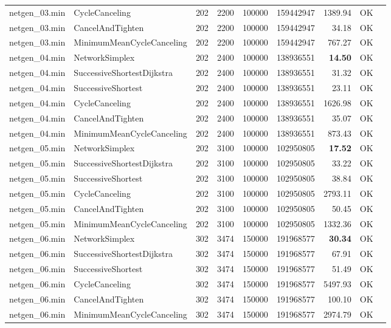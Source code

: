 \begin{longtable}{llrrrrrrl}
netgen\_03.min & CycleCanceling & 202 & 2200 & 100000 & 159442947 & 1389.94 & OK \\
netgen\_03.min & CancelAndTighten & 202 & 2200 & 100000 & 159442947 & 34.18 & OK \\
netgen\_03.min & MinimumMeanCycleCanceling & 202 & 2200 & 100000 & 159442947 & 767.27 & OK \\
\midrule
netgen\_04.min & NetworkSimplex & 202 & 2400 & 100000 & 138936551 & \textbf{14.50} & OK \\
netgen\_04.min & SuccessiveShortestDijkstra & 202 & 2400 & 100000 & 138936551 & 31.32 & OK \\
netgen\_04.min & SuccessiveShortest & 202 & 2400 & 100000 & 138936551 & 23.11 & OK \\
netgen\_04.min & CycleCanceling & 202 & 2400 & 100000 & 138936551 & 1626.98 & OK \\
netgen\_04.min & CancelAndTighten & 202 & 2400 & 100000 & 138936551 & 35.07 & OK \\
netgen\_04.min & MinimumMeanCycleCanceling & 202 & 2400 & 100000 & 138936551 & 873.43 & OK \\
\midrule
netgen\_05.min & NetworkSimplex & 202 & 3100 & 100000 & 102950805 & \textbf{17.52} & OK \\
netgen\_05.min & SuccessiveShortestDijkstra & 202 & 3100 & 100000 & 102950805 & 33.22 & OK \\
netgen\_05.min & SuccessiveShortest & 202 & 3100 & 100000 & 102950805 & 38.84 & OK \\
netgen\_05.min & CycleCanceling & 202 & 3100 & 100000 & 102950805 & 2793.11 & OK \\
netgen\_05.min & CancelAndTighten & 202 & 3100 & 100000 & 102950805 & 50.45 & OK \\
netgen\_05.min & MinimumMeanCycleCanceling & 202 & 3100 & 100000 & 102950805 & 1332.36 & OK \\
\midrule
netgen\_06.min & NetworkSimplex & 302 & 3474 & 150000 & 191968577 & \textbf{30.34} & OK \\
netgen\_06.min & SuccessiveShortestDijkstra & 302 & 3474 & 150000 & 191968577 & 67.91 & OK \\
netgen\_06.min & SuccessiveShortest & 302 & 3474 & 150000 & 191968577 & 51.49 & OK \\
netgen\_06.min & CycleCanceling & 302 & 3474 & 150000 & 191968577 & 5497.93 & OK \\
netgen\_06.min & CancelAndTighten & 302 & 3474 & 150000 & 191968577 & 100.10 & OK \\
netgen\_06.min & MinimumMeanCycleCanceling & 302 & 3474 & 150000 & 191968577 & 2974.79 & OK \\

\end{longtable}
